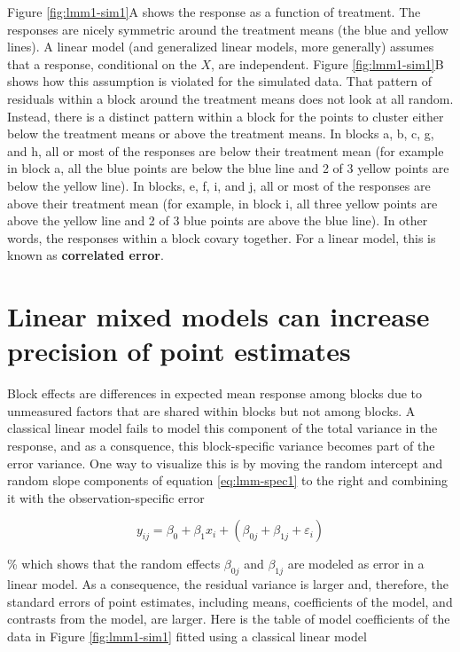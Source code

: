 \documentclass[]{book}
\begin{document}
Figure \ref{fig:lmm1-sim1}A shows the response as a function of
treatment. The responses are nicely symmetric around the treatment means
(the blue and yellow lines). A linear model (and generalized linear
models, more generally) assumes that a response, conditional on the
\(X\), are independent. Figure \ref{fig:lmm1-sim1}B shows how this
assumption is violated for the simulated data. That pattern of residuals
within a block around the treatment means does not look at all random.
Instead, there is a distinct pattern within a block for the points to
cluster either below the treatment means or above the treatment means.
In blocks a, b, c, g, and h, all or most of the responses are below
their treatment mean (for example in block a, all the blue points are
below the blue line and 2 of 3 yellow points are below the yellow line).
In blocks, e, f, i, and j, all or most of the responses are above their
treatment mean (for example, in block i, all three yellow points are
above the yellow line and 2 of 3 blue points are above the blue line).
In other words, the responses within a block covary together. For a
linear model, this is known as \textbf{correlated error}.

\section{Linear mixed models can increase precision of point
estimates}\label{linear-mixed-models-can-increase-precision-of-point-estimates}

Block effects are differences in expected mean response among blocks due
to unmeasured factors that are shared within blocks but not among
blocks. A classical linear model fails to model this component of the
total variance in the response, and as a consquence, this block-specific
variance becomes part of the error variance. One way to visualize this
is by moving the random intercept and random slope components of
equation \eqref{eq:lmm-spec1} to the right and combining it with the
observation-specific error

\begin{equation}
y_{ij} = \beta_{0} + \beta_{1} x_i + (\beta_{0j} + \beta_{1j} + \varepsilon_i)
\label{eq:lmm-spec1b}
\end{equation}

\% which shows that the random effects \(\beta_{0j}\) and \(\beta_{1j}\)
are modeled as error in a linear model. As a consequence, the residual
variance is larger and, therefore, the standard errors of point
estimates, including means, coefficients of the model, and contrasts
from the model, are larger. Here is the table of model coefficients of
the data in Figure \ref{fig:lmm1-sim1} fitted using a classical linear
model
\end{document}
